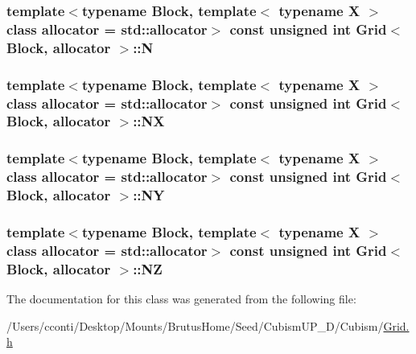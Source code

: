\subsubsection[{N}]{\setlength{\rightskip}{0pt plus 5cm}template$<$typename Block, template$<$ typename X $>$ class allocator = std\+::allocator$>$ const unsigned int {\bf Grid}$<$ Block, allocator $>$\+::N\hspace{0.3cm}{\ttfamily [protected]}}\label{class_grid_a9ec3e376ce1de3c9e056a7ccebb34d42}
\hypertarget{class_grid_a5253120e941ec878f57dd17d5f54cadd}{}
\subsubsection[{N\+X}]{\setlength{\rightskip}{0pt plus 5cm}template$<$typename Block, template$<$ typename X $>$ class allocator = std\+::allocator$>$ const unsigned int {\bf Grid}$<$ Block, allocator $>$\+::N\+X\hspace{0.3cm}{\ttfamily [protected]}}\label{class_grid_a5253120e941ec878f57dd17d5f54cadd}
\hypertarget{class_grid_a8956891d20426acabca4252ec7e299bc}{}
\subsubsection[{N\+Y}]{\setlength{\rightskip}{0pt plus 5cm}template$<$typename Block, template$<$ typename X $>$ class allocator = std\+::allocator$>$ const unsigned int {\bf Grid}$<$ Block, allocator $>$\+::N\+Y\hspace{0.3cm}{\ttfamily [protected]}}\label{class_grid_a8956891d20426acabca4252ec7e299bc}
\hypertarget{class_grid_ad6632ff47c714e008ba88a89b4c1684b}{}
\subsubsection[{N\+Z}]{\setlength{\rightskip}{0pt plus 5cm}template$<$typename Block, template$<$ typename X $>$ class allocator = std\+::allocator$>$ const unsigned int {\bf Grid}$<$ Block, allocator $>$\+::N\+Z\hspace{0.3cm}{\ttfamily [protected]}}\label{class_grid_ad6632ff47c714e008ba88a89b4c1684b}


The documentation for this class was generated from the following file\+:\begin{DoxyCompactItemize}
\item 
/\+Users/cconti/\+Desktop/\+Mounts/\+Brutus\+Home/\+Seed/\+Cubism\+U\+P\+\_\+D/\+Cubism/\hyperlink{_grid_8h}{Grid.\+h}\end{DoxyCompactItemize}
